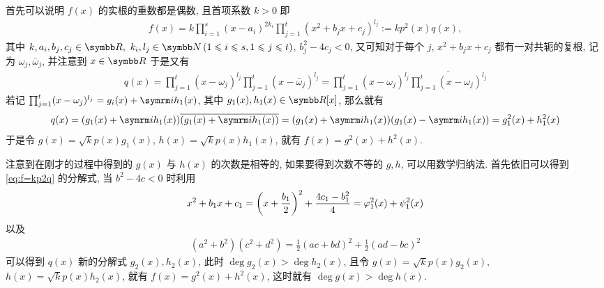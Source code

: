 \documentclass{ctexart}
\begin{document}
\begin{exercise}[series=exer]
\begin{answer}
\begin{answersheet}
            \item 首先可以说明 $ f(x) $ 的实根的重数都是偶数, 且首项系数 $ k > 0 $ 即
            \begin{align}
                f(x) = k\prod_{i = 1}^{s}(x - a_{i})^{2k_{i}}\prod_{j = 1}^{t}(x^{2} + b_{j}x + c_{j})^{l_{j}} := kp^{2}(x)q(x), \label{eq:f=kp2q}
            \end{align}
            其中 $ k, a_{i}, b_{j}, c_{j} \in \R,\ k_{i}, l_{j} \in \N \,(1 \le i \le s, 1 \le j \le t) $,  $ b_{j}^{2} - 4c_{j} < 0 $, 又可知对于每个 $ j $,  $ x^{2} + b_{j}x + c_{j} $ 都有一对共轭的复根, 记为 $ \omega_{j}, \bar{\omega}_{j} $, 并注意到 $ x \in \R $ 于是又有
            \begin{align*}
                q(x) = \prod_{j = 1}^{t} ( x - \omega_{j})^{l_{j}}\prod_{j = 1}^{t} ( x - \bar{\omega}_{j})^{l_{j}} = \prod_{j = 1}^{t} ( x - \omega_{j})^{l_{j}}\overline{\prod_{j = 1}^{t} ( x - \omega_{j})^{l_{j}}}
            \end{align*} 
            若记 $ \prod_{j = 1}^{t} ( x - \omega_{j})^{l_{j}} = g_{i}(x) + \mi h_{1}(x) $, 其中 $ g_{1}(x), h_{1}(x) \in \R[x] $, 那么就有
            \begin{align*}
                q(x) = (g_{1}(x) + \mi h_{1}(x))\overline{(g_{1}(x) + \mi h_{1}(x))} = (g_{1}(x) + \mi h_{1}(x))(g_{1}(x) - \mi h_{1}(x)) = g_{1}^{2}(x) + h_{1}^{2}(x)
            \end{align*}
            于是令 $ g(x) = \sqrt{k}p(x)g_{1}(x) $, $ h(x) = \sqrt{k}p(x)h_{1}(x) $, 就有 $ f(x) = g^{2}(x) + h^{2}(x) $. 
            \item 注意到在刚才的过程中得到的 $ g(x) $ 与 $ h(x) $ 的次数是相等的, 如果要得到次数不等的 $ g, h $, 可以用数学归纳法. 首先依旧可以得到 \eqref{eq:f=kp2q} 的分解式, 当 $ b^{2} - 4c < 0 $ 时利用
            \begin{align*}
                x^{2} + b_{1}x + c_{1} = \qty(x + \frac{b_{1}}{2})^{2} + \frac{4c_{1} - b_{1}^{2}}{4} = \varphi_{1}^{2}(x) + \psi_{1}^{2}(x)
            \end{align*}
            以及
            \begin{align*}
                (a^{2} + b^{2})(c^{2} + d^{2}) = \frac{1}{2}(ac + bd)^{2} + \frac{1}{2}(ad - bc)^{2}
            \end{align*}
            可以得到 $ q(x) $ 新的分解式 $ g_{2}(x), h_{2}(x) $, 此时 $ \deg g_{2}(x) > \deg h_{2}(x) $, 且令 $ g(x) = \sqrt{k}p(x)g_{2}(x) $, $ h(x) = \sqrt{k}p(x)h_{2}(x) $, 就有 $ f(x) = g^{2}(x) + h^{2}(x) $, 这时就有 $ \deg g(x) > \deg h(x) $. 

\end{answersheet}
\end{answer}
\end{exercise}
\end{document}
